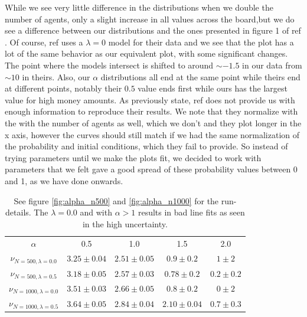 \documentclass[a4paper,11pt]{article}
\begin{document}
{While we see very little difference in the distributions when we double the number of agents, only a slight increase in all values across the board,but we do see a difference between our distributions and the ones presented in figure 1 of ref \cite{AgentBasedModels}. Of course, ref \cite{AgentBasedModels} uses a $\lambda = 0$ model for their data and we see that the plot has a lot of the same behavior as our equivalent plot, with some significant changes. The point where the models intersect is shifted to around $\sim -1.5$ in our data from $\sim 10$ in theirs. Also, our $\alpha$ distributions all end at the same point while theirs end at different points, notably their $0.5$ value ends first while ours has the largest value for high money amounts. As previously state, ref \cite{AgentBasedModels} does not provide us with enough information to reproduce their results. We note that they normalize with the with the number of agents as well, which we don't and they plot longer in the x axis, however the curves should still match if we had the same normalization of the probability and initial conditions, which they fail to provide. So instead of trying parameters until we make the plots fit, we decided to work with parameters that we felt gave a good spread of these probability values between 0 and 1, as we have done onwards.  


\begin{table}[h]
\caption{See figure \ref{fig:alpha_n500} and \ref{fig:alpha_n1000} for the run-details. The $\lambda=0.0$ and with $\alpha>1$ results in bad line fits as seen in the high uncertainty. }
\begin{center}
\begin{tabular}{c|c|c|c|c}
$\alpha$ & 0.5 & 1.0 & 1.5 & 2.0 \\
$\nu_{N=500, \lambda=0.0}$ & $3.25\pm0.04$ & $2.51 \pm 0.05$ & $0.9 \pm 0.2$ & $1 \pm 2$ \\
$\nu_{N=500, \lambda=0.5}$ & $3.18\pm 0.05$ & $2.57\pm0.03$ & $0.78\pm 0.2$ & $0.2\pm 0.2$  \\
$\nu_{N=1000, \lambda=0.0}$ & $3.51\pm 0.03$ & $2.66\pm 0.05$ & $0.8\pm0.2$  & $0\pm 2$ \\
$\nu_{N=1000, \lambda=0.5}$ & $3.64\pm0.05$ & $2.84\pm 0.04$ & $2.10\pm 0.04$ & $0.7\pm 0.3$ 
\end{tabular}
\end{center}
\label{tab:closepartner}
\end{table}%







}
\end{document}
